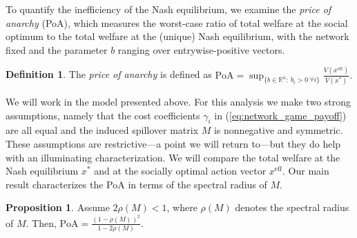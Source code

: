 \documentclass{notices}
\theoremstyle{definition}\newtheorem{problem}{Problem}
\theoremstyle{definition} \newtheorem{remark}{Remark}
\theoremstyle{definition} \newtheorem{claim}{Claim}
\theoremstyle{definition} \newtheorem{thm}{Theorem}
\theoremstyle{definition} \newtheorem*{thmNoNum}{Theorem}
\theoremstyle{definition} \newtheorem{definition}{Definition}
\theoremstyle{definition} \theoremstyle{remark}
\theoremstyle{definition} \newtheorem{note}{Note}
\theoremstyle{definition} \newtheorem{notation}{Notation}
\theoremstyle{definition} \theoremstyle{plain}
\theoremstyle{definition} \newtheorem{condition}{Condition}
\theoremstyle{definition} \newtheorem{lem}{Lemma}
\theoremstyle{definition} \newtheorem{corollary}{Corollary}
\theoremstyle{definition} \newtheorem{prop}{Proposition}
\theoremstyle{definition} \newtheorem{ax}{Axiom}
\theoremstyle{definition} \newtheorem{assumption}{Assumption}
\theoremstyle{definition} \newtheorem{example}{Example}
\theoremstyle{definition} \newtheorem{rmk}{Remark}
\theoremstyle{definition} \newtheorem{res}{Result}
\theoremstyle{definition} \newtheorem{que}{Question}
\theoremstyle{definition} \newtheorem{conjecture}{Conjecture}
\theoremstyle{definition}
\begin{document}
To quantify the inefficiency of the Nash equilibrium, we examine the \emph{price of anarchy} (PoA), which measures the worst-case ratio of total welfare at the social optimum to the total welfare at the (unique) Nash equilibrium, with the network fixed and the parameter $b$ ranging over entrywise-positive vectors.


\begin{definition}
The \emph{price of anarchy} is defined as
$
\text{PoA} = \sup_{\{b \in \mathbb{R}^n:\ b_i>0\ \forall i\}} \frac{V(x^{\mathrm{eff}})}{V(x^*)}.
$
\end{definition}

We will work in the model presented above. For this analysis we make two strong assumptions, namely that the cost coefficients $\gamma_i$ in (\ref{eq:network_game_payoff}) are all equal and the induced spillover matrix $M$ is nonnegative and symmetric. These assumptions are restrictive---a point we will return to---but they do help with an illuminating characterization. We will compare the total welfare at the Nash equilibrium $x^*$ and at the socially optimal action vector $x^{\mathrm{eff}}$.
 Our main result characterizes the PoA in terms of the spectral radius of $M$.

\begin{prop}
\label{thm:poa}
Assume $2\rho(M)<1$, where $\rho(M)$ denotes the spectral radius of $M$. Then,
$
\text{PoA} = \frac{(1-\rho(M))^2}{1-2\rho(M)}.
$
\end{prop}
\end{document}
